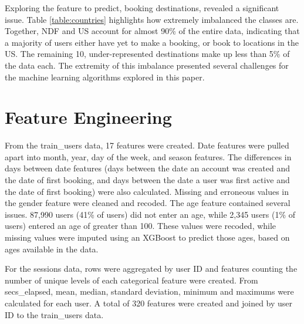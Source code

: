 \documentclass{article}
\begin{document}
Exploring the feature to predict, booking destinations, revealed a significant issue. Table \ref{table:countries} highlights how extremely imbalanced the classes are. Together, NDF and US account for almost 90\% of the entire data, indicating that a majority of users either have yet to make a booking, or book to locations in the US. The remaining 10, under-represented destinations make up less than 5\% of the data each. The extremity of this imbalance presented several challenges for the machine learning algorithms explored in this paper.


\section{Feature Engineering}

From the train\_users data, 17 features were created. Date features were pulled apart into month, year, day of the week, and season features. The differences in days between date features (days between the date an account was created and the date of first booking, and days between the date a user was first active and the date of first booking) were also calculated. Missing and erroneous values in the gender feature were cleaned and recoded. The age feature contained several issues. 87,990 users (41\% of users) did not enter an age, while 2,345 users (1\% of users) entered an age of greater than 100. These values were recoded, while missing values were imputed using an XGBoost to predict those ages, based on ages available in the data. 

For the sessions data, rows were aggregated by user ID and features counting the number of unique levels of each categorical feature were created. From secs\_elapsed, mean, median, standard deviation, minimum and maximums were calculated for each user. A total of 320 features were created and joined by user ID to the train\_users data. 
\end{document}
